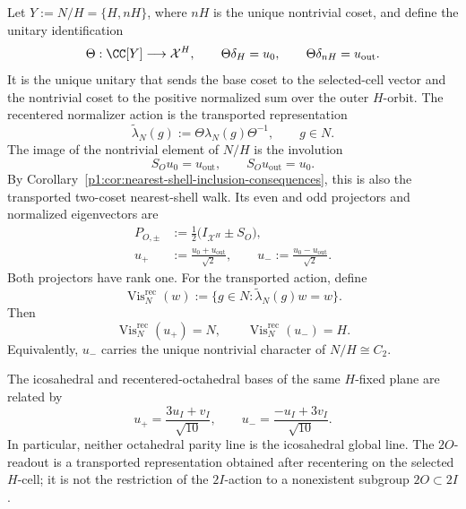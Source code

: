 \documentclass[11pt]{article}
\begin{document}
\begin{theorem}
\begin{enumerate}[label=\textup{(\roman*)}]
Let \(Y:=N/H=\{H,nH\}\), where \(nH\) is the unique nontrivial coset, and
define the unitary identification
\begin{equation}
\label{p1:eq:normalizer-transport-map}
    \Theta:\CC[Y]\longrightarrow\mathcal X^H,
    \qquad
    \Theta\delta_H=u_0,
    \qquad
    \Theta\delta_{nH}=u_{\mathrm{out}}.
\end{equation}
It is the unique unitary that sends the base coset to the selected-cell
vector and the nontrivial coset to the positive normalized sum over the
outer \(H\)-orbit.
The recentered normalizer action is the transported representation
\[
    \widetilde\lambda_N(g)
    :=\Theta\lambda_N(g)\Theta^{-1},
    \qquad g\in N.
\]
The image of the nontrivial element of \(N/H\) is the involution
\[
    S_Ou_0=u_{\mathrm{out}},
    \qquad
    S_Ou_{\mathrm{out}}=u_0.
\]
By Corollary~\ref{p1:cor:nearest-shell-inclusion-consequences}, this is also
the transported two-coset nearest-shell walk.
Its even and odd projectors and normalized eigenvectors are
\begin{equation}
\label{p1:eq:recentered-octahedral-projectors}
\begin{split}
    P_{O,\pm}
    &:=\frac12\bigl(I_{\mathcal X^H}\pm S_O\bigr),
    \\
    u_+&:=\frac{u_0+u_{\mathrm{out}}}{\sqrt2},
    \qquad
    u_-:=\frac{u_0-u_{\mathrm{out}}}{\sqrt2}.
\end{split}
\end{equation}
Both projectors have rank one.  For the transported action, define
\[
    \operatorname{Vis}^{\mathrm{rec}}_N(w)
    :=\{g\in N:\widetilde\lambda_N(g)w=w\}.
\]
Then
\[
    \operatorname{Vis}^{\mathrm{rec}}_N(u_+)=N,
    \qquad
    \operatorname{Vis}^{\mathrm{rec}}_N(u_-)=H.
\]
Equivalently, \(u_-\) carries the unique nontrivial character of
\(N/H\cong C_2\).

The icosahedral and recentered-octahedral bases of the same \(H\)-fixed plane
are related by
\begin{equation}
\label{p1:eq:icosahedral-octahedral-basis-change}
    u_+=\frac{3u_I+v_I}{\sqrt{10}},
    \qquad
    u_-=\frac{-u_I+3v_I}{\sqrt{10}}.
\end{equation}
In particular, neither octahedral parity line is the icosahedral global line.
The \(2O\)-readout is a transported representation obtained after recentering
on the selected \(H\)-cell; it is not the restriction of the \(2I\)-action to
a nonexistent subgroup \(2O\subset2I\).
\end{enumerate}
\end{theorem}
\end{document}

